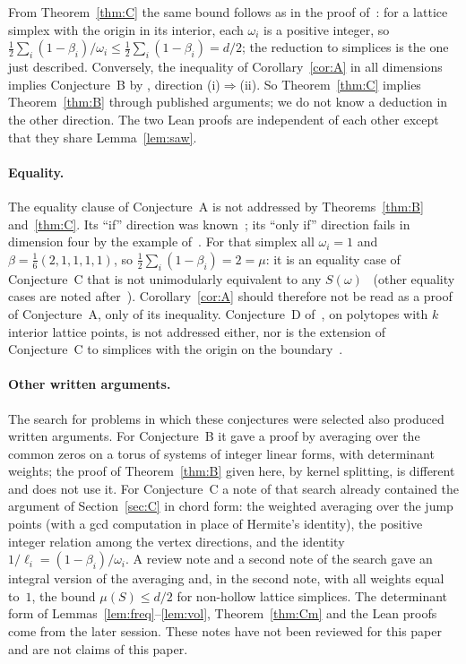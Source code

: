 \documentclass[11pt]{article}
\theoremstyle{definition}
\theoremstyle{remark}
\begin{document}
From Theorem~\ref{thm:C} the same bound follows as in the proof
of~\cite[Corollary~4.3]{css}: for a lattice simplex with the origin in its
interior, each $\omega_i$ is a positive integer, so
$\frac12\sum_i(1-\beta_i)/\omega_i\le\frac12\sum_i(1-\beta_i)=d/2$; the
reduction to simplices is the one just described. Conversely, the inequality
of Corollary~\ref{cor:A} in all dimensions implies Conjecture~B by
\cite[Theorem~1.2]{css}, direction (i)$\Rightarrow$(ii). So
Theorem~\ref{thm:C} implies Theorem~\ref{thm:B} through published arguments;
we do not know a deduction in the other direction. The two Lean proofs are
independent of each other except that they share Lemma~\ref{lem:saw}.

\paragraph{Equality.} The equality clause of Conjecture~A is not addressed by
Theorems~\ref{thm:B} and~\ref{thm:C}. Its ``if'' direction was known~\cite[eq.~(1)
and Corollary~2.2]{css}; its ``only if'' direction fails in dimension four by
the example of~\cite{p21}. For that simplex all $\omega_i=1$ and
$\beta=\frac16(2,1,1,1,1)$, so $\frac12\sum_i(1-\beta_i)=2=\mu$: it is an
equality case of Conjecture~C that is not unimodularly equivalent to any
$S(\omega)$~\cite[Remark~5]{p21} (other equality cases are noted
after~\cite[Corollary~5.1]{css}). Corollary~\ref{cor:A}
should therefore not be read as a proof of Conjecture~A, only of its
inequality. Conjecture~D of~\cite{css}, on polytopes with $k$ interior lattice
points, is not addressed either, nor is the extension of Conjecture~C to
simplices with the origin on the boundary~\cite[Section~4.4]{css}.

\paragraph{Other written arguments.} The search for problems in which these
conjectures were selected also produced written arguments. For Conjecture~B it
gave a proof by averaging over the common zeros on a torus of systems of
integer linear forms, with determinant weights; the proof of
Theorem~\ref{thm:B} given here, by kernel splitting, is different and does not
use it. For Conjecture~C a note of that search already contained the argument
of Section~\ref{sec:C} in chord form: the weighted averaging over the jump
points (with a gcd computation in place of Hermite's identity), the positive
integer relation among the vertex directions, and the identity
$1/\ell_i=(1-\beta_i)/\omega_i$. A review note and a second note of the
search gave an integral version of the averaging and, in the second note, with
all weights equal to~$1$, the bound $\mu(S)\le d/2$ for non-hollow lattice
simplices. The determinant form of Lemmas~\ref{lem:freq}--\ref{lem:vol},
Theorem~\ref{thm:Cm} and the Lean proofs come from the later session. These
notes have not been reviewed for this paper and are not claims of this paper.
\end{document}

